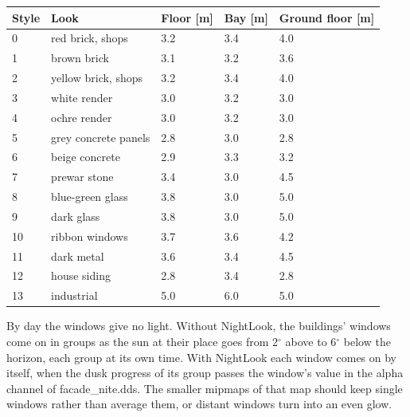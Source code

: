 \documentclass[Orbiter Developer Manual.tex]{subfiles}
\begin{document}
\begin{sloppypar}
	\begin{longtable}{ |p{}|p{}|p{}|p{}|p{}| }
	\hline\rule{0pt}{2ex}
	\textbf{Style} & \textbf{Look} & \textbf{Floor [m]} & \textbf{Bay [m]} & \textbf{Ground floor [m]}\\
	\hline\rule{0pt}{2ex}
	0 & red brick, shops & 3.2 & 3.4 & 4.0\\
	\hline\rule{0pt}{2ex}
	1 & brown brick & 3.1 & 3.2 & 3.6\\
	\hline\rule{0pt}{2ex}
	2 & yellow brick, shops & 3.2 & 3.4 & 4.0\\
	\hline\rule{0pt}{2ex}
	3 & white render & 3.0 & 3.2 & 3.0\\
	\hline\rule{0pt}{2ex}
	4 & ochre render & 3.0 & 3.2 & 3.0\\
	\hline\rule{0pt}{2ex}
	5 & grey concrete panels & 2.8 & 3.0 & 2.8\\
	\hline\rule{0pt}{2ex}
	6 & beige concrete & 2.9 & 3.3 & 3.2\\
	\hline\rule{0pt}{2ex}
	7 & prewar stone & 3.4 & 3.0 & 4.5\\
	\hline\rule{0pt}{2ex}
	8 & blue-green glass & 3.8 & 3.0 & 5.0\\
	\hline\rule{0pt}{2ex}
	9 & dark glass & 3.8 & 3.0 & 5.0\\
	\hline\rule{0pt}{2ex}
	10 & ribbon windows & 3.7 & 3.6 & 4.2\\
	\hline\rule{0pt}{2ex}
	11 & dark metal & 3.6 & 3.4 & 4.5\\
	\hline\rule{0pt}{2ex}
	12 & house siding & 2.8 & 3.4 & 2.8\\
	\hline\rule{0pt}{2ex}
	13 & industrial & 5.0 & 6.0 & 5.0\\
	\hline
	\end{longtable}

\noindent
By day the windows give no light. Without NightLook, the buildings' windows come on in groups as the sun at their place goes from 2$^{\circ}$ above to 6$^{\circ}$ below the horizon, each group at its own time. With NightLook each window comes on by itself, when the dusk progress of its group passes the window's value in the alpha channel of facade\_nite.dds. The smaller mipmaps of that map should keep single windows rather than average them, or distant windows turn into an even glow.



\end{sloppypar}
\end{document}
